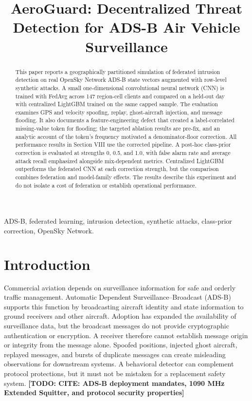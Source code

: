 \documentclass[conference]{IEEEtran}
\title{AeroGuard: Decentralized Threat Detection for ADS-B Air Vehicle Surveillance}
\author{\IEEEauthorblockN{Author Name(s)}\IEEEauthorblockA{Affiliation(s)\\Email(s)}}
\newcommand{\todo}[1]{\textbf{[TODO: #1]}}
\begin{document}
\maketitle



\begin{abstract}

This paper reports a geographically partitioned simulation of federated intrusion detection on real OpenSky Network ADS-B state vectors augmented with row-level synthetic attacks. A small one-dimensional convolutional neural network (CNN) is trained with FedAvg across 147 region-cell clients and compared on a held-out day with centralized LightGBM trained on the same capped sample. The evaluation examines GPS and velocity spoofing, replay, ghost-aircraft injection, and message flooding. It also documents a feature-engineering defect that created a label-correlated missing-value token for flooding; the targeted ablation results are pre-fix, and an analytic account of the token's frequency motivated a denominator-floor correction. All performance results in Section VIII use the corrected pipeline. A post-hoc class-prior correction is evaluated at strengths 0, 0.5, and 1.0, with false alarm rate and average attack recall emphasized alongside mix-dependent metrics. Centralized LightGBM outperforms the federated CNN at each correction strength, but the comparison combines federation and model-family effects. The results describe this experiment and do not isolate a cost of federation or establish operational performance.

\end{abstract}

\begin{IEEEkeywords}ADS-B, federated learning, intrusion detection, synthetic attacks, class-prior correction, OpenSky Network.\end{IEEEkeywords}



\section{Introduction}

Commercial aviation depends on surveillance information for safe and orderly traffic management. Automatic Dependent Surveillance--Broadcast (ADS-B) supports this function by broadcasting aircraft identity and state information to ground receivers and other aircraft. Adoption has expanded the availability of surveillance data, but the broadcast messages do not provide cryptographic authentication or encryption. A receiver therefore cannot establish message origin or integrity from the message alone. Spoofed positions, injected ghost aircraft, replayed messages, and bursts of duplicate messages can create misleading observations for downstream systems. A behavioral detector can complement protocol protections, but it must not be mistaken for a replacement safety system. \todo{CITE: ADS-B deployment mandates, 1090 MHz Extended Squitter, and protocol security properties}
\end{document}
